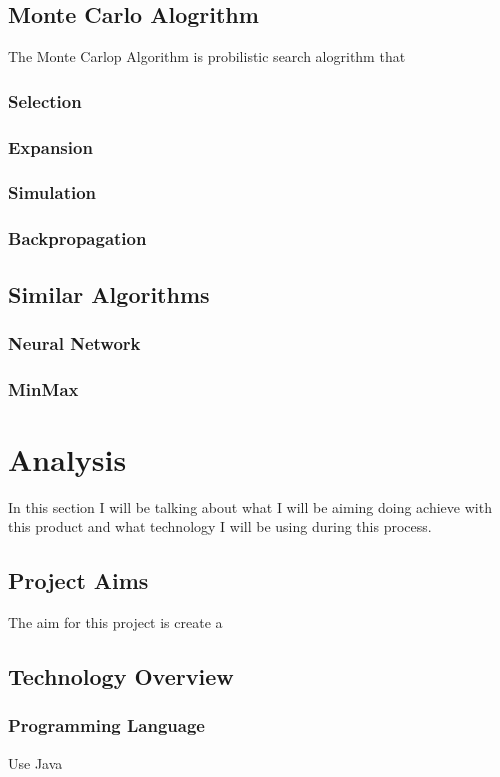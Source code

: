 \subsection {Monte Carlo Alogrithm}
The Monte Carlop Algorithm is probilistic search alogrithm that 

\subsubsection{Selection}
\subsubsection{Expansion}
\subsubsection{Simulation}
\subsubsection{Backpropagation}
\subsection{Similar Algorithms}

\subsubsection{Neural Network}

\subsubsection{MinMax}


\section{Analysis}
In this section I will be talking about what I will be aiming doing achieve with this product and what technology I will be using during this process. 
\subsection{Project Aims}
The aim for this project is create a 
\subsection {Technology Overview}
\subsubsection{Programming Language}
Use Java

